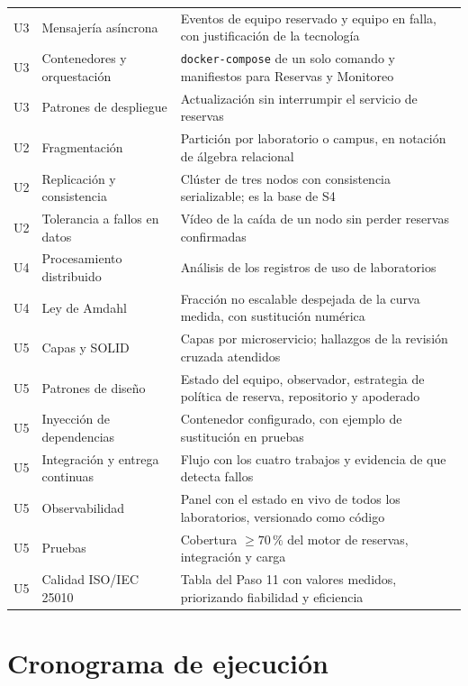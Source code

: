 \documentclass[11pt,a4paper]{article}
\begin{document}
\begin{center}
\begin{longtable}{@{}p{1.1cm}p{4.9cm}p{8.9cm}@{}}
			U3 & Mensajería asíncrona & Eventos de equipo reservado y equipo en falla, con justificación de la tecnología \\
			U3 & Contenedores y orquestación & \texttt{docker-compose} de un solo comando y manifiestos para Reservas y Monitoreo \\
			U3 & Patrones de despliegue & Actualización sin interrumpir el servicio de reservas \\
			U2 & Fragmentación & Partición por laboratorio o campus, en notación de álgebra relacional \\
			U2 & Replicación y consistencia & Clúster de tres nodos con consistencia serializable; es la base de S4 \\
			U2 & Tolerancia a fallos en datos & Vídeo de la caída de un nodo sin perder reservas confirmadas \\
			U4 & Procesamiento distribuido & Análisis de los registros de uso de laboratorios \\
			U4 & Ley de Amdahl & Fracción no escalable despejada de la curva medida, con sustitución numérica \\
			U5 & Capas y SOLID & Capas por microservicio; hallazgos de la revisión cruzada atendidos \\
			U5 & Patrones de diseño & Estado del equipo, observador, estrategia de política de reserva, repositorio y apoderado \\
			U5 & Inyección de dependencias & Contenedor configurado, con ejemplo de sustitución en pruebas \\
			U5 & Integración y entrega continuas & Flujo con los cuatro trabajos y evidencia de que detecta fallos \\
			U5 & Observabilidad & Panel con el estado en vivo de todos los laboratorios, versionado como código \\
			U5 & Pruebas & Cobertura $\geq 70\,\%$ del motor de reservas, integración y carga \\
			U5 & Calidad ISO/IEC 25010 & Tabla del Paso 11 con valores medidos, priorizando fiabilidad y eficiencia \\
			\bottomrule
		\end{longtable}
	\end{center}
	
	\section{Cronograma de ejecución}
	
\end{document}
